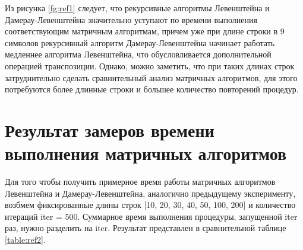 \documentclass[12pt]{report}
\begin{document}
\begin{figure}[ht!]
\end{figure}


\par

Из рисунка \ref{fg:ref1} следует, что рекурсивные алгоритмы Левенштейна и Дамерау-Левенштейна значительно уступают по времени выполнения соответствующим матричным алгоритмам, причем уже при длине строки в 9 символов рекурсивный алгоритм Дамерау-Левенштейна начинает работать медленнее алгоритма Левенштейна, что обусловливается дополнительной операцией транспозиции. Однако, можно заметить, что при таких длинах строк затруднительно сделать сравнительный анализ матричных алгоритмов, для этого потребуются более длинные строки и большее количество повторений процедур.

\section{Результат замеров времени выполнения матричных алгоритмов} 

Для того чтобы получить примерное время работы матричных алгоритмов Левенштейна и Дамерау-Левенштейна, аналогично предыдущему эксперименту, возбмем фиксированные длины строк [10, 20, 30, 40, 50, 100, 200] и количество итераций iter = 500. Суммарное время выполнения процедуры, запущенной iter раз, нужно разделить на iter. Результат представлен в сравнительной таблице \ref{table:ref2}.
\end{document}
